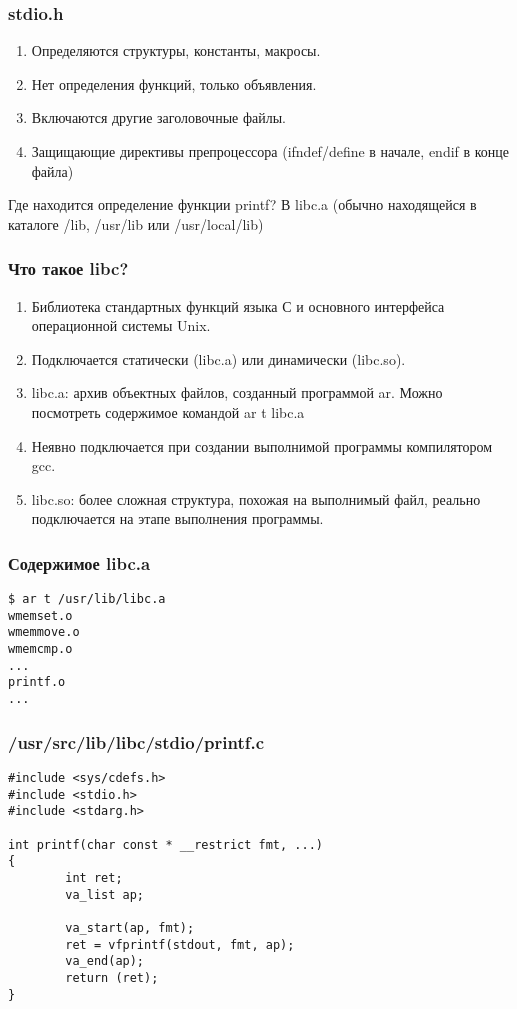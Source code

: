 \documentclass[hyperref={unicode=true}]{beamer}
\begin{document}
\begin{frame}
\frametitle{stdio.h}
\begin{enumerate}
\item Определяются структуры, константы, макросы. 
\item Нет определения функций, только объявления. 
\item Включаются другие заголовочные файлы. 
\item Защищающие директивы препроцессора (ifndef/define в начале,
  endif в конце файла) 
\end{enumerate}

Где находится определение функции printf? \pause В libc.a (обычно находящейся
в каталоге /lib, /usr/lib или /usr/local/lib)
\end{frame}

\begin{frame}
\frametitle{Что такое libc?}
\begin{enumerate}
\item Библиотека стандартных функций языка С и основного интерфейса
  операционной системы Unix.
\item Подключается статически (libc.a) или динамически (libc.so).
\item libc.a: архив объектных файлов, созданный программой ar. Можно
  посмотреть содержимое командой ar t libc.a 
\item Неявно подключается при создании выполнимой программы
  компилятором gcc.
\item libc.so: более сложная структура, похожая на выполнимый
  файл, реально подключается на этапе выполнения программы. 
\end{enumerate}
\end{frame}

\begin{frame}[fragile]
\frametitle{Содержимое libc.a}
\begin{verbatim}
$ ar t /usr/lib/libc.a 
wmemset.o
wmemmove.o
wmemcmp.o
...
printf.o
...
\end{verbatim}

\end{frame}

\begin{frame}[fragile]
\frametitle{/usr/src/lib/libc/stdio/printf.c}
\begin{lstlisting}
#include <sys/cdefs.h>
#include <stdio.h>
#include <stdarg.h>

int printf(char const * __restrict fmt, ...)
{
        int ret;
        va_list ap;

        va_start(ap, fmt);
        ret = vfprintf(stdout, fmt, ap);
        va_end(ap);
        return (ret);
}

\end{lstlisting}
\end{frame}
\end{document}
